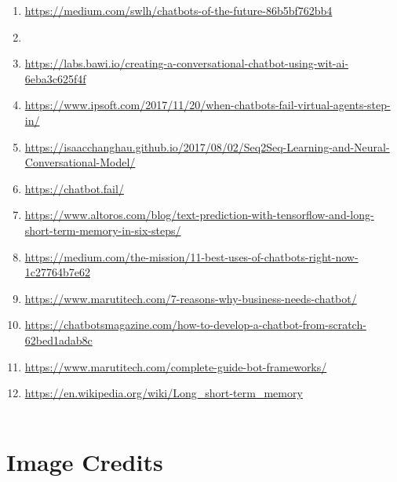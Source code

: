 \documentclass[a4paper,12pt]{report}
\begin{document}
\begin{enumerate}[align=left, rightmargin=\dimexpr\linewidth-14cm-\leftmargin\relax]
\item \url{https://medium.com/swlh/chatbots-of-the-future-86b5bf762bb4}
\item {}
\item \url{https://labs.bawi.io/creating-a-conversational-chatbot-using-wit-ai-6eba3c625f4f}
\item \url{https://www.ipsoft.com/2017/11/20/when-chatbots-fail-virtual-agents-step-in/}
\item \url{https://isaacchanghau.github.io/2017/08/02/Seq2Seq-Learning-and-Neural-Conversational-Model/}
\item \url{https://chatbot.fail/}
\item \url{https://www.altoros.com/blog/text-prediction-with-tensorflow-and-long-short-term-memory-in-six-steps/}
\item \url{https://medium.com/the-mission/11-best-uses-of-chatbots-right-now-1c27764b7e62}
\item \url{https://www.marutitech.com/7-reasons-why-business-needs-chatbot/}
\item \url{https://chatbotsmagazine.com/how-to-develop-a-chatbot-from-scratch-62bed1adab8c}
\item \url{https://www.marutitech.com/complete-guide-bot-frameworks/}
\item \url{https://en.wikipedia.org/wiki/Long_short-term_memory}\\\\
\end{enumerate}
\newpage
{\let\clearpage\relax \chapter {Image Credits}}
\end{document}
